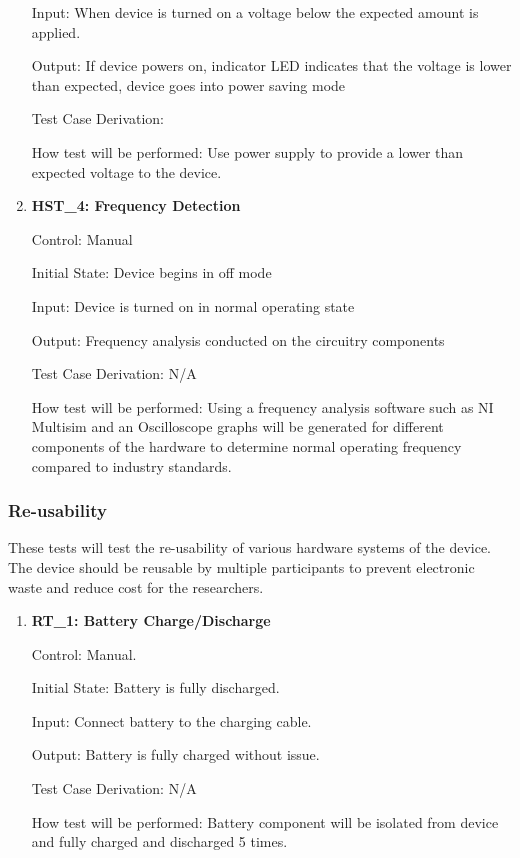 \documentclass[12pt, titlepage]{article}
\begin{document}
\begin{enumerate}
Input: When device is turned on a voltage below the expected amount is applied.

Output: If device powers on, indicator LED indicates that the voltage is lower than expected, device goes into power saving mode

Test Case Derivation:

How test will be performed: Use power supply to provide a lower than expected voltage to the device.

\item{\textbf{HST\_4: Frequency Detection}}\label{HST4}

Control: Manual

Initial State: Device begins in off mode

Input: Device is turned on in normal operating state

Output: Frequency analysis conducted on the circuitry components

Test Case Derivation: N/A

How test will be performed: Using a frequency analysis software such as NI Multisim and an Oscilloscope graphs will be generated for different components of the hardware to determine normal operating frequency compared to industry standards.

\end{enumerate}

\subsubsection{Re-usability}

These tests will test the re-usability of various hardware systems of the device. The device should be reusable by multiple participants to prevent electronic waste and reduce cost for the researchers. 

\begin{enumerate}


\item{\textbf{RT\_1: Battery Charge/Discharge}}\label{RT1}

Control: Manual.

Initial State: Battery is fully discharged.

Input: Connect battery to the charging cable.

Output: Battery is fully charged without issue.

Test Case Derivation: N/A

How test will be performed: Battery component will be isolated from device and fully charged and discharged 5 times.

\end{enumerate}
\end{document}
